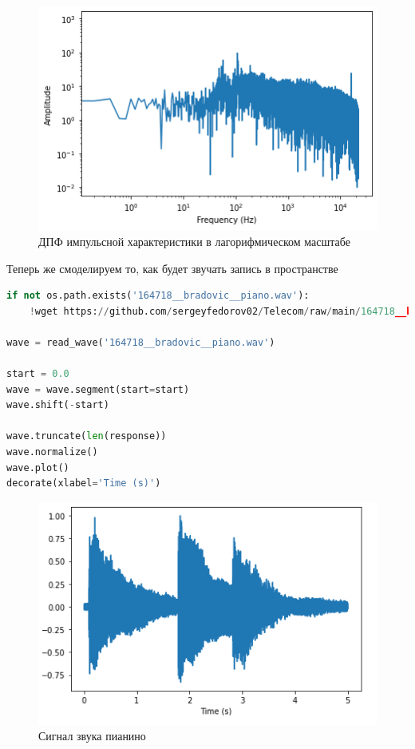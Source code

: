 \begin{figure}[H]
	\begin{center}
		\includegraphics[scale=1]{fig/lab10/lab10_07.png}
		\caption{ДПФ импульсной характеристики в лагорифмическом масштабе} 
	\end{center}
\end{figure}

Теперь же смоделируем то, как будет звучать запись в пространстве

\begin{lstlisting}[language=Python]
if not os.path.exists('164718__bradovic__piano.wav'):
    !wget https://github.com/sergeyfedorov02/Telecom/raw/main/164718__bradovic__piano.wav
    
wave = read_wave('164718__bradovic__piano.wav')

start = 0.0
wave = wave.segment(start=start)
wave.shift(-start)

wave.truncate(len(response))
wave.normalize()
wave.plot()
decorate(xlabel='Time (s)')
\end{lstlisting}

\begin{figure}[H]
	\begin{center}
		\includegraphics[scale=1]{fig/lab10/lab10_08.png}
		\caption{Сигнал звука пианино}
	\end{center}
\end{figure}


